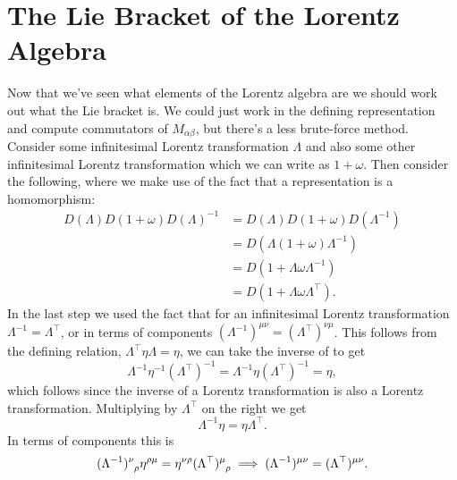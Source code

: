 \documentclass[fleqn]{NotesClass}
\newcommand{\ident}{1}
\newcommand{\minkowskiMetric}{\eta}
\newcommand{\trans}{\top}
\begin{document}
    \section{The Lie Bracket of the Lorentz Algebra}
    Now that we've seen what elements of the Lorentz algebra are we should work out what the Lie bracket is.
    We could just work in the defining representation and compute commutators of \(M_{\alpha\beta}\), but there's a less brute-force method.
    Consider some infinitesimal Lorentz transformation \(\Lambda\) and also some other infinitesimal Lorentz transformation which we can write as \(\ident + \omega\).
    Then consider the following, where we make use of the fact that a representation is a homomorphism:
    \begin{align}
        D(\Lambda)D(1 + \omega) D(\Lambda)^{-1} &= D(\Lambda)D(1 + \omega)D(\Lambda^{-1})\\
        &= D(\Lambda(1 + \omega)\Lambda^{-1})\\
        &= D(1 + \Lambda\omega\Lambda^{-1})\\
        &= D(1 + \Lambda\omega\Lambda^{\trans}).
    \end{align}
    In the last step we used the fact that for an infinitesimal Lorentz transformation \(\Lambda^{-1} = \Lambda^\trans\), or in terms of components \((\Lambda^{-1})^{\mu\nu} = (\Lambda^{\trans})^{\nu\mu}\).
    This follows from the defining relation, \(\Lambda^\trans \minkowskiMetric \Lambda = \minkowskiMetric\), we can take the inverse of to get
    \begin{equation}
        \Lambda^{-1}\minkowskiMetric^{-1}(\Lambda^{\trans})^{-1} = \Lambda^{-1}\minkowskiMetric(\Lambda^\trans)^{-1} = \eta,
    \end{equation}
    which follows since the inverse of a Lorentz transformation is also a Lorentz transformation.
    Multiplying by \(\Lambda^\trans\) on the right we get
    \begin{equation}
        \Lambda^{-1}\minkowskiMetric = \minkowskiMetric \Lambda^\trans.
    \end{equation}
    In terms of components this is
    \begin{equation}
        \tensor{(\Lambda^{-1})}{^\nu_\rho} \minkowskiMetric^{\rho\mu} = \minkowskiMetric^{\nu\rho} \tensor{(\Lambda^\trans)}{^\mu_\rho} \implies (\Lambda^{-1})^{\mu\nu} = (\Lambda^{\trans})^{\mu\nu}.
    \end{equation}
    
\end{document}
